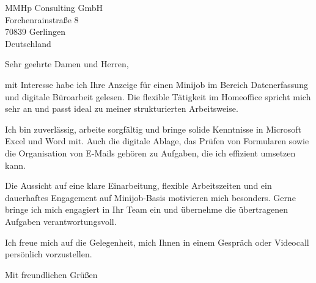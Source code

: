 \documentclass[12pt,a4paper,parskip=half]{scrlttr2}
\begin{document}
\begin{letter}{
  MMHp Consulting GmbH\\
  Forchenrainstraße 8\\
  70839 Gerlingen\\
  Deutschland
}

\opening{Sehr geehrte Damen und Herren,}

mit Interesse habe ich Ihre Anzeige für einen Minijob im Bereich Datenerfassung und digitale Büroarbeit gelesen. Die flexible Tätigkeit im Homeoffice spricht mich sehr an und passt ideal zu meiner strukturierten Arbeitsweise.

Ich bin zuverlässig, arbeite sorgfältig und bringe solide Kenntnisse in Microsoft Excel und Word mit. Auch die digitale Ablage, das Prüfen von Formularen sowie die Organisation von E-Mails gehören zu Aufgaben, die ich effizient umsetzen kann.

Die Aussicht auf eine klare Einarbeitung, flexible Arbeitszeiten und ein dauerhaftes Engagement auf Minijob-Basis motivieren mich besonders. Gerne bringe ich mich engagiert in Ihr Team ein und übernehme die übertragenen Aufgaben verantwortungsvoll.

Ich freue mich auf die Gelegenheit, mich Ihnen in einem Gespräch oder Videocall persönlich vorzustellen.

\closing{Mit freundlichen Grüßen}

\end{letter}
\end{document}
